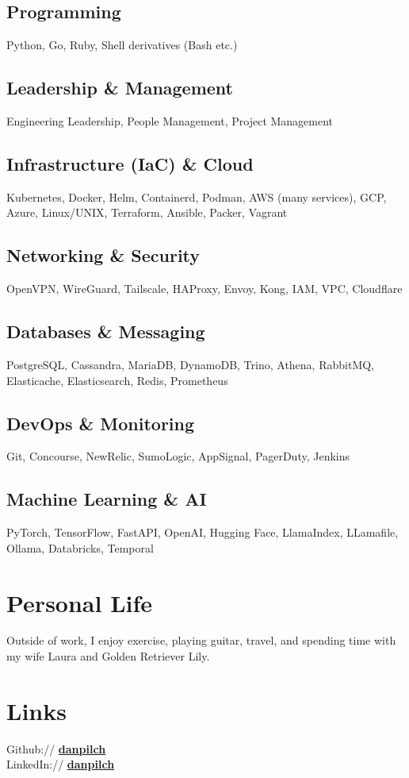 \documentclass[]{resume}
\begin{document}
\begin{minipage}[t]{0.33\textwidth}
\subsection{Programming}
Python, Go, Ruby, Shell derivatives (Bash etc.)
\sectionsep

\subsection{Leadership \& Management}
Engineering Leadership, People Management, Project Management
\sectionsep

\subsection{Infrastructure (IaC) \& Cloud}
Kubernetes, Docker, Helm, Containerd, Podman, AWS (many services), GCP, Azure, Linux/UNIX, Terraform, Ansible, Packer, Vagrant
\sectionsep

\subsection{Networking \& Security}
OpenVPN, WireGuard, Tailscale, HAProxy, Envoy, Kong, IAM, VPC, Cloudflare
\sectionsep

\subsection{Databases \& Messaging}
PostgreSQL, Cassandra, MariaDB, DynamoDB, Trino, Athena, RabbitMQ, Elasticache, Elasticsearch, Redis, Prometheus
\sectionsep

\subsection{DevOps \& Monitoring}
Git, Concourse, NewRelic, SumoLogic, AppSignal, PagerDuty, Jenkins
\sectionsep

\subsection{Machine Learning \& AI}
PyTorch, TensorFlow, FastAPI, OpenAI, Hugging Face, LlamaIndex, LLamafile, Ollama, Databricks, Temporal
\sectionsep


\section{Personal Life}
Outside of work, I enjoy exercise, playing guitar, travel, and spending time with my wife Laura and Golden Retriever Lily.
\sectionsep


\section{Links}
Github:// \href{https://github.com/danpilch}{\bf danpilch} \\
LinkedIn://  \href{https://www.linkedin.com/in/danpilch}{\bf danpilch}
\sectionsep

\end{minipage}
\end{document}
